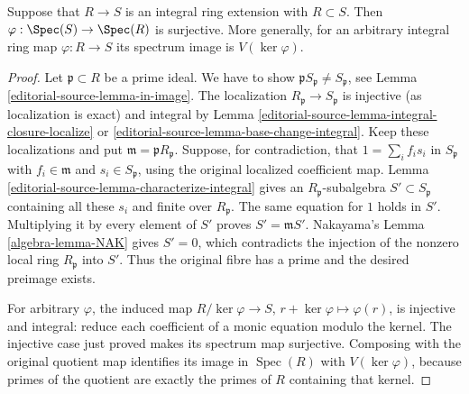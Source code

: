 \begin{lemma}
\label{editorial-source-lemma-integral-overring-surjective}
Suppose that $R \to S$ is an integral
ring extension with $R \subset S$.
Then $\varphi : \Spec(S) \to \Spec(R)$
is surjective. More generally, for an arbitrary integral ring map
$\varphi:R\to S$ its spectrum image is $V(\ker\varphi)$.
\end{lemma}

\begin{proof}
Let $\mathfrak p \subset R$ be a prime ideal.
We have to show $\mathfrak pS_{\mathfrak p} \not = S_{\mathfrak p}$, see
Lemma \ref{editorial-source-lemma-in-image}.
The localization $R_{\mathfrak p} \to S_{\mathfrak p}$ is injective
(as localization is exact) and integral by
Lemma \ref{editorial-source-lemma-integral-closure-localize} or
\ref{editorial-source-lemma-base-change-integral}.
Keep these localizations and put $\mathfrak m=\mathfrak pR_{\mathfrak p}$.
Suppose, for contradiction, that
$1=\sum_i f_is_i$ in $S_{\mathfrak p}$ with
$f_i\in\mathfrak m$ and $s_i\in S_{\mathfrak p}$, using the
original localized coefficient map. Lemma
\ref{editorial-source-lemma-characterize-integral} gives an
$R_{\mathfrak p}$-subalgebra $S'\subset S_{\mathfrak p}$
containing all these $s_i$ and finite over $R_{\mathfrak p}$.
The same equation for $1$ holds in $S'$. Multiplying it by every
element of $S'$ proves $S'=\mathfrak mS'$. Nakayama's
Lemma \ref{algebra-lemma-NAK} gives $S'=0$, which contradicts the injection
of the nonzero local ring $R_{\mathfrak p}$ into $S'$.
Thus the original fibre has a prime and the desired preimage exists.

For arbitrary $\varphi$, the induced map
$R/\ker\varphi\to S$, $r+\ker\varphi\mapsto\varphi(r)$,
is injective and integral: reduce each coefficient of a monic
equation modulo the kernel. The injective case just proved makes
its spectrum map surjective. Composing with the original quotient
map identifies its image in $\operatorname{Spec}(R)$ with
$V(\ker\varphi)$, because primes of the quotient are exactly
the primes of $R$ containing that kernel.
\end{proof}